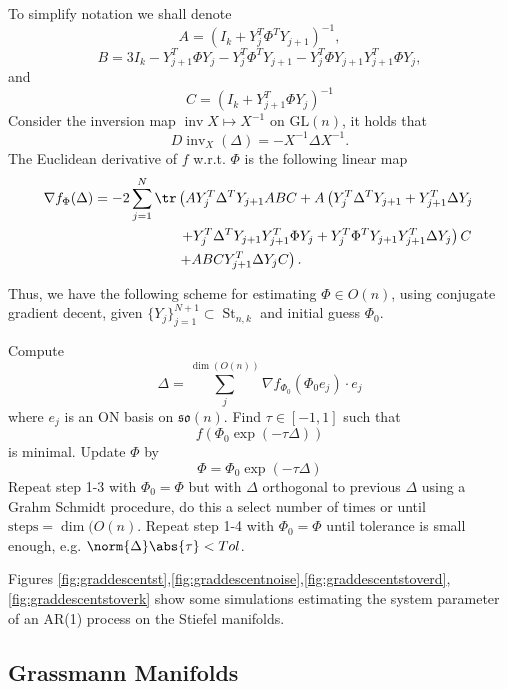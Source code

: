 \documentclass[12pt,a4paper]{article}
\theoremstyle{definition}
\theoremstyle{remark}
\DeclareMathOperator{\St}{St}
\DeclareMathOperator{\inv}{inv}
\begin{document}
To simplify notation we shall denote
\[
A=\left(I_k + Y_j^T \Phi^T Y_{j+1}\right)^{-1},
\]
\[
B=3I_k -Y_{j+1}^T\Phi Y_j - Y_j^T \Phi^T Y_{j+1} - Y_j^T\Phi Y_{j+1} Y_{j+1}^T \Phi Y_j,
\]
and
\[
C= \left(I_k + Y_{j+1}^T \Phi Y_{j}\right)^{-1}
\]
Consider the inversion map $\inv X\mapsto X^{-1}$ on $\mathrm{GL}(n)$, it holds that
\[
D\inv_X(\Delta) = -X^{-1} \Delta X^{-1}.
\]
The Euclidean derivative of $f$ w.r.t. $\Phi$ is the following linear map
\[
\begin{aligned}
\nabla f_\Phi(\Delta)= -2\sum_{j=1}^N \tr &\left(A  Y_j^T \Delta^T Y_{j+1} AB C+ A \left(  Y_j^T \Delta^T Y_{j+1} +  Y_{j+1}^T \Delta Y_{j}\right.\right.\\
&\left.\left.+Y_j^T\Delta^T Y_{j+1} Y_{j+1}^T \Phi Y_{j} + Y_j^T \Phi^T Y_{j+1} Y_{j+1}^T \Delta Y_{j}\right)C\right.\\
& \left.+ABCY_{j+1}^T \Delta Y_{j}C\right).
\end{aligned}
\]

Thus, we have the following scheme for estimating $\Phi\in O(n)$, using conjugate gradient decent, given $\{Y_j\}_{j=1}^{N+1}\subset \St_{n,k}$ and initial guess $\Phi_0$.

\begin{algorithm}
\caption{Estimating system parameters on $\St_{n,k}$}
\label{alg:stiefelgrad}
\begin{algorithmic}[1]
\State Compute 
\[
\Delta=\sum_{j}^{\dim (O(n))}\nabla f_{\Phi_0}(\Phi_0 e_j) \cdot e_j
\]
where $e_j$ is an ON basis on $\mathfrak{so}(n)$.
\State Find $\tau\in [-1,1]$ such that
\[
f(\Phi_0 \exp(-\tau \Delta))
\]
is minimal.
\State Update $\Phi$ by
\[
\Phi= \Phi_0\exp(-\tau \Delta)
\]
\State Repeat step 1-3 with $\Phi_0=\Phi$ but with $\Delta$ orthogonal to previous $\Delta$ using a Grahm Schmidt procedure, do this a select number of times or until $\text{steps}=\dim(O(n)$.
\State Repeat step 1-4 with $\Phi_0=\Phi$ until tolerance is small enough, e.g. $\norm{\Delta} \abs{\tau}<Tol$.
\end{algorithmic}
\end{algorithm}


Figures \ref{fig:graddescentst},\ref{fig:graddescentnoise},\ref{fig:graddescentstoverd},\ref{fig:graddescentstoverk} show some simulations estimating the system parameter of an AR(1) process on the Stiefel manifolds.

\subsection{Grassmann Manifolds}
\label{sec:grass}
\end{document}
